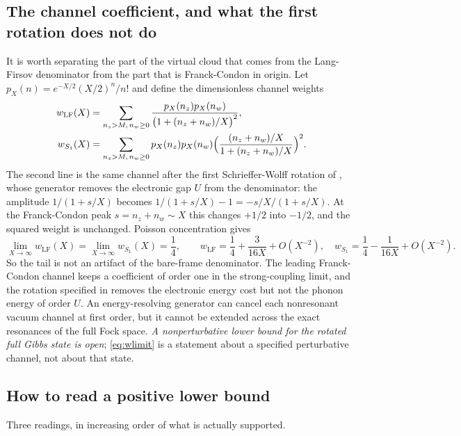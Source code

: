 \documentclass[11pt]{article}
\theoremstyle{definition}
\theoremstyle{remark}
\begin{document}
\subsection{The channel coefficient, and what the first rotation does not do}

It is worth separating the part of the virtual cloud that comes from the
Lang-Firsov denominator from the part that is Franck-Condon in origin. Let
$p_{X}(n)=e^{-X/2}(X/2)^{n}/n!$ and define the dimensionless channel weights
\begin{align}
w_{\mathrm{LF}}(X)&=\sum_{n_{z}>M,\,n_{w}\ge0}
\frac{p_{X}(n_{z})p_{X}(n_{w})}{\bigl(1+(n_{z}+n_{w})/X\bigr)^{2}},
\label{eq:wLF}\\
w_{S_{1}}(X)&=\sum_{n_{z}>M,\,n_{w}\ge0}p_{X}(n_{z})p_{X}(n_{w})
\Bigl(\frac{(n_{z}+n_{w})/X}{1+(n_{z}+n_{w})/X}\Bigr)^{2}.
\label{eq:wS1}
\end{align}
The second line is the same channel after the first Schrieffer-Wolff rotation of
\cite{largeu}, whose generator removes the electronic gap $U$ from the
denominator: the amplitude $1/(1+s/X)$ becomes $1/(1+s/X)-1=-s/X/(1+s/X)$. At the
Franck-Condon peak $s=n_{z}+n_{w}\sim X$ this changes $+1/2$ into $-1/2$, and the
squared weight is unchanged. Poisson concentration gives
\begin{equation}
\lim_{X\to\infty}w_{\mathrm{LF}}(X)=\lim_{X\to\infty}w_{S_{1}}(X)=\frac14,
\qquad
w_{\mathrm{LF}}=\frac14+\frac{3}{16X}+O(X^{-2}),\quad
w_{S_{1}}=\frac14-\frac{1}{16X}+O(X^{-2}).
\label{eq:wlimit}
\end{equation}
So the tail is not an artifact of the bare-frame denominator. The leading
Franck-Condon channel keeps a coefficient of order one in the strong-coupling
limit, and the rotation specified in \cite{largeu} removes the electronic energy
cost but not the phonon energy of order $U$. An energy-resolving generator can
cancel each nonresonant vacuum channel at first order, but it cannot be extended
across the exact resonances of the full Fock space. \emph{A nonperturbative lower
bound for the rotated full Gibbs state is open}; \eqref{eq:wlimit} is a statement
about a specified perturbative channel, not about that state.

\subsection{How to read a positive lower bound}

Three readings, in increasing order of what is actually supported.
\end{document}
